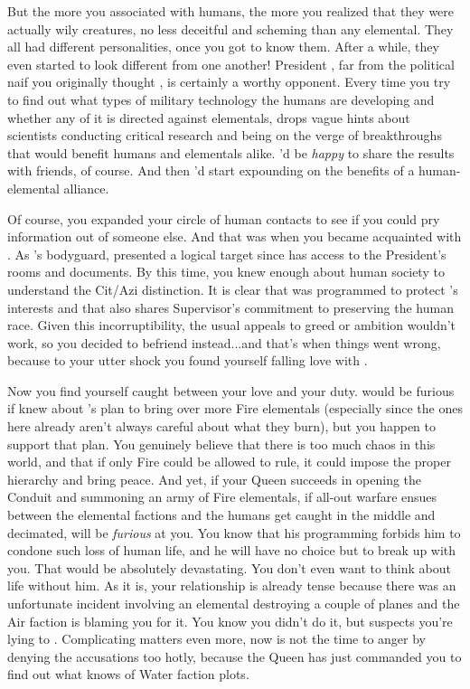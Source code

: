 \documentclass[char]{elementals}
\begin{document}
But the more you associated with humans, the more you realized that they were actually wily creatures, no less deceitful and scheming than any elemental.  They all had different personalities, once you got to know them.  After a while, they even started to look different from one another!  President \cLeader{}, far from the political naif you originally thought \cLeader{\them}, is certainly a worthy opponent.  Every time you try to find out what types of military technology the humans are developing and whether any of it is directed against elementals, \cLeader{\they} drops vague hints about \cLeader{\their} scientists conducting critical research and being on the verge of breakthroughs that would benefit humans and elementals alike.  \cLeader{\They}'d be \emph{happy} to share the results with \cLeader{\their} friends, of course.  And then \cLeader{\they}'d start expounding on the benefits of a human-elemental alliance.

Of course, you expanded your circle of human contacts to see if you could pry information out of someone else.  And that was when you became acquainted with \cRomeo{}.  As \cLeader{}'s bodyguard, \cRomeo{\they} presented a logical target since \cRomeo{\they} has access to the President's rooms and documents.  By this time, you knew enough about human society to understand the Cit/Azi distinction.  It is clear that \cRomeo{\they} was programmed to protect \cLeader{}'s interests and that \cRomeo{\they} also shares \cRomeo{\their} Supervisor's commitment to preserving the human race.  Given this incorruptibility, the usual appeals to greed or ambition wouldn't work, so you decided to befriend \cRomeo{\them} instead...and that's when things went wrong, because to your utter shock you found yourself falling love with \cRomeo{\them}.

Now you find yourself caught between your love and your duty.  \cRomeo{} would be furious if \cRomeo{\they} knew about \cQueen{}'s plan to bring over more Fire elementals (especially since the ones here already aren't always careful about what they burn), but you happen to support that plan. You genuinely believe that there is too much chaos in this world, and that if only Fire could be allowed to rule, it could impose the proper hierarchy and bring peace.  And yet, if your Queen succeeds in opening the Conduit and summoning an army of Fire elementals, if all-out warfare ensues between the elemental factions and the humans get caught in the middle and decimated, \cRomeo{} will be \emph{furious} at you.  You know that his programming forbids him to condone such loss of human life, and he will have no choice but to break up with you.  That would be absolutely devastating.  You don't even want to think about life without him.  As it is, your relationship is already tense because there was an unfortunate incident involving an elemental destroying a couple of planes and the Air faction is blaming you for it.  You know you didn't do it, but \cRomeo{} suspects you're lying to \cRomeo{\them}.  Complicating matters even more, now is not the time to anger \cKing{} by denying the accusations too hotly, because the Queen has just commanded you to find out what \cKing{\they} knows of Water faction plots.  
\end{document}
